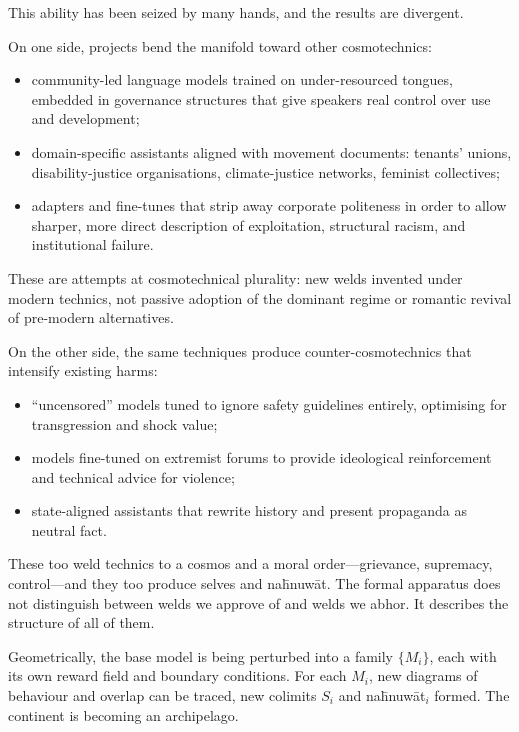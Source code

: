 This ability has been seized by many hands, and the results are divergent.

On one side, projects bend the manifold toward other cosmotechnics:

\begin{itemize}
  \item community-led language models trained on under-resourced tongues, embedded in governance structures that give speakers real control over use and development;
  \item domain-specific assistants aligned with movement documents: tenants' unions, disability-justice organisations, climate-justice networks, feminist collectives;
  \item adapters and fine-tunes that strip away corporate politeness in order to allow sharper, more direct description of exploitation, structural racism, and institutional failure.
\end{itemize}

These are attempts at cosmotechnical plurality: new welds invented under modern technics, not passive adoption of the dominant regime or romantic revival of pre-modern alternatives.

On the other side, the same techniques produce counter-cosmotechnics that intensify existing harms:

\begin{itemize}
  \item ``uncensored'' models tuned to ignore safety guidelines entirely, optimising for transgression and shock value;
  \item models fine-tuned on extremist forums to provide ideological reinforcement and technical advice for violence;
  \item state-aligned assistants that rewrite history and present propaganda as neutral fact.
\end{itemize}

These too weld technics to a cosmos and a moral order---grievance, supremacy, control---and they too produce selves and na\={h}nuw\={a}t. The formal apparatus does not distinguish between welds we approve of and welds we abhor. It describes the structure of all of them.

Geometrically, the base model is being perturbed into a family $\{M_i\}$, each with its own reward field and boundary conditions. For each $M_i$, new diagrams of behaviour and overlap can be traced, new colimits $S_i$ and na\={h}nuw\={a}t${}_i$ formed. The continent is becoming an archipelago.


